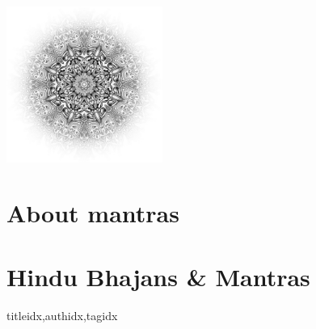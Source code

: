 \documentclass[twoside,10pt]{book}
\begin{document}
  \tableofcontents


  \begin{center}%
    \vspace*{\fill}%
    \includegraphics[width=0.382\textwidth]{shamanic_mandala_bw_ed_by_larva_CC0_1400px.jpg}
    \vspace*{\fill}%
  \end{center}

  \clearpage\scleardpage
     \section{About mantras}
       
     \clearpage\scleardpage
    \section{Hindu Bhajans \& Mantras}
      \begin{songs}{titleidx,authidx,tagidx}
        \setcounter{songnum}{100}
        
      \end{songs}
     \scleardpage
\end{document}
